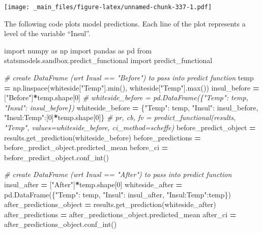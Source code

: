 \documentclass[
]{book}
\newenvironment{Shaded}{\begin{snugshade}}{\end{snugshade}}
\newcommand{\BuiltInTok}[1]{#1}
\newcommand{\CommentTok}[1]{\textcolor[rgb]{0.56,0.35,0.01}{\textit{#1}}}
\newcommand{\DecValTok}[1]{\textcolor[rgb]{0.00,0.00,0.81}{#1}}
\newcommand{\ImportTok}[1]{#1}
\newcommand{\NormalTok}[1]{#1}
\newcommand{\OperatorTok}[1]{\textcolor[rgb]{0.81,0.36,0.00}{\textbf{#1}}}
\newcommand{\StringTok}[1]{\textcolor[rgb]{0.31,0.60,0.02}{#1}}
\begin{document}
\texttt{[image: \_main\_files/figure-latex/unnamed-chunk-337-1.pdf]}

The following code plots model predictions. Each line of the plot represents a level of the variable ``Insul''.

\begin{Shaded}
\begin{Highlighting}[]
\ImportTok{import}\NormalTok{ numpy }\ImportTok{as}\NormalTok{ np}
\ImportTok{import}\NormalTok{ pandas }\ImportTok{as}\NormalTok{ pd}
\ImportTok{from}\NormalTok{ statsmodels.sandbox.predict\_functional }\ImportTok{import}\NormalTok{ predict\_functional}

\CommentTok{\# create DataFrame (wrt Inusl == "Before") to pass into predict function}
\NormalTok{temp }\OperatorTok{=}\NormalTok{ np.linspace(whiteside[}\StringTok{"Temp"}\NormalTok{].}\BuiltInTok{min}\NormalTok{(), whiteside[}\StringTok{"Temp"}\NormalTok{].}\BuiltInTok{max}\NormalTok{())}
\NormalTok{insul\_before }\OperatorTok{=}\NormalTok{ [}\StringTok{"Before"}\NormalTok{]}\OperatorTok{*}\NormalTok{temp.shape[}\DecValTok{0}\NormalTok{]}
\CommentTok{\# whiteside\_before = pd.DataFrame(\{"Temp": temp, "Insul": insul\_before\})}
\NormalTok{whiteside\_before }\OperatorTok{=}\NormalTok{ \{}\StringTok{"Temp"}\NormalTok{: temp, }\StringTok{"Insul"}\NormalTok{: insul\_before, }\StringTok{"Insul:Temp"}\NormalTok{:[}\DecValTok{0}\NormalTok{]}\OperatorTok{*}\NormalTok{temp.shape[}\DecValTok{0}\NormalTok{]\}}
\CommentTok{\# pr, cb, fv = predict\_functional(results, "Temp", values=whiteside\_before, ci\_method=\textquotesingle{}scheffe\textquotesingle{})}
\NormalTok{before\_predict\_object }\OperatorTok{=}\NormalTok{ results.get\_prediction(whiteside\_before)}
\NormalTok{before\_predictions }\OperatorTok{=}\NormalTok{ before\_predict\_object.predicted\_mean}
\NormalTok{before\_ci }\OperatorTok{=}\NormalTok{ before\_predict\_object.conf\_int()}

\CommentTok{\# create DataFrame (wrt Inusl == "After") to pass into predict function}
\NormalTok{insul\_after }\OperatorTok{=}\NormalTok{ [}\StringTok{"After"}\NormalTok{]}\OperatorTok{*}\NormalTok{temp.shape[}\DecValTok{0}\NormalTok{]}
\NormalTok{whiteside\_after }\OperatorTok{=}\NormalTok{ pd.DataFrame(\{}\StringTok{"Temp"}\NormalTok{: temp, }\StringTok{"Insul"}\NormalTok{: insul\_after, }\StringTok{"Insul:Temp"}\NormalTok{:temp\})}
\NormalTok{after\_predictions\_object }\OperatorTok{=}\NormalTok{ results.get\_prediction(whiteside\_after)}
\NormalTok{after\_predictions }\OperatorTok{=}\NormalTok{ after\_predictions\_object.predicted\_mean}
\NormalTok{after\_ci }\OperatorTok{=}\NormalTok{ after\_predictions\_object.conf\_int()}


\end{Highlighting}
\end{Shaded}
\end{document}
